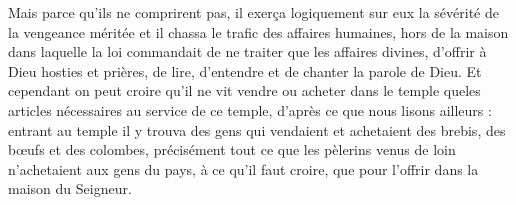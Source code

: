 Mais parce qu’ils ne comprirent pas, il exerça logiquement sur eux la sévérité de la vengeance méritée et il chassa le trafic des affaires humaines, hors de la maison dans laquelle la loi commandait de ne traiter que les affaires divines, d’offrir à Dieu hosties et prières, de lire, d’entendre et de chanter la parole de Dieu. Et cependant on peut croire qu’il ne vit vendre ou acheter dans le temple queles articles nécessaires au service de ce temple, d’après ce que nous lisons ailleurs : entrant au temple il y trouva des gens qui vendaient et achetaient des brebis, des bœufs et des colombes, précisément tout ce que les pèlerins venus de loin n’achetaient aux gens du pays, à ce qu’il faut croire, que pour l’offrir dans la maison du Seigneur.
